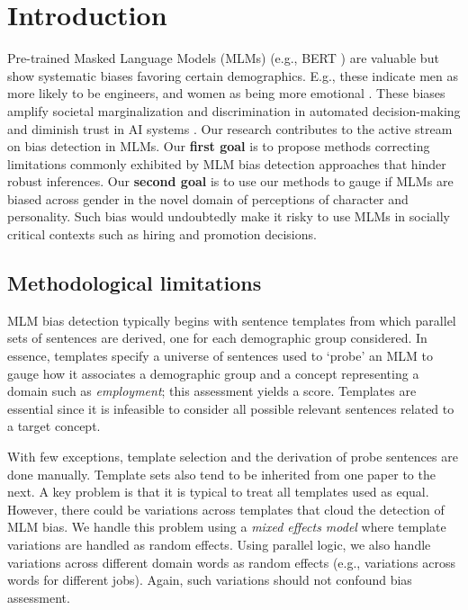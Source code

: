 \section{Introduction}

\noindent Pre-trained Masked Language Models (MLMs) (e.g., BERT \cite{devlin-etal-2019-bert}) are valuable but show systematic biases favoring certain demographics.
%
E.g., these indicate men as more likely to be engineers, and women as being more emotional \citep{gallegos2023bias,lee2018detecting, parikh2019addressing, booth2021integrating}.
%
These biases amplify societal marginalization and discrimination in automated decision-making and diminish trust in AI systems \cite{solaiman2023evaluating}.
%
Our research contributes to the active stream on bias detection in MLMs.  
%
Our \textbf{first goal} is to propose methods correcting  limitations commonly exhibited by MLM  bias detection approaches that hinder robust inferences.
%
Our \textbf{second goal} is to use our methods to gauge if MLMs are biased across gender in the novel domain of perceptions of character and personality.
%
Such bias would undoubtedly make it risky to use MLMs in socially critical contexts such as hiring and promotion decisions.

\subsection{Methodological limitations}

MLM bias detection typically begins with sentence templates from which parallel sets of sentences are derived, one for each demographic group considered. 
%
In essence, templates specify a universe of sentences used to `probe' an MLM to gauge how it associates a demographic group and a concept representing a domain such as \emph{employment}; this assessment yields a score.
Templates are essential since it is infeasible to consider all possible relevant sentences related to a target concept.  

With few exceptions, template selection and the derivation of probe sentences are done manually. 
Template sets also tend to be inherited from one paper to the next.
%
A key problem is that it is typical to treat all templates used as equal.
%
However, there could be variations across templates that cloud the detection of MLM bias.
%
We handle this problem using a \emph{mixed effects model} where template variations are handled as random effects.  
%
Using parallel logic, we also handle variations across different domain words as random effects (e.g., variations across words for different jobs).
%
Again, such variations should not confound bias assessment.

